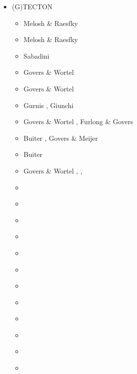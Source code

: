 \begin{itemize}
\item {\codefont (G)TECTON}  

\begin{scriptsize}
\begin{itemize}
\item[\nineteeneighty] Melosh \& Raesfky \cite{mera80}
\item[\nineteeneightyone] Melosh \& Raesfky \cite{mera81}
\item[\nineteeneightysix] Sabadini \etal \cite{sayp86}
\item[\nineteenninetythree] Govers \& Wortel \cite{gowo93}
\item[\nineteenninetyfive] Govers \& Wortel \cite{gowo95}
\item[\nineteenninetysix] Gurnis \etal \cite{guez96}, Giunchi \etal \cite{gisb96}
\item[\nineteenninetynine] Govers \& Wortel \cite{gowo99}, Furlong \& Govers \cite{fugo99}
\item[\twothousandone] Buiter \etal \cite{bugw01}, Govers \& Meijer \cite{gome01}
\item[\twothousandtwo] Buiter \etal \cite{bugw02}
\item[\twothousandfive] Govers \& Wortel \cite{gowo05}, \cite{vanw05},
                        \cite{vabl05}
\item[\twothousandsix] \cite{degw06}\cite{libi06}\cite{scdm06}
\item[\twothousandseven] \cite{vabl07}
\item[\twothousandeight] \cite{degw08}\cite{degw08b}
\item[\twothousandnine] \cite{ladg09}\cite{plmg09}
\item[\twothousandten] \cite{vago10}\cite{plmf10}
\item[\twothousandeleven] \cite{bagw11}\cite{bagw11b}
\item[\twothousandthirteen] \cite{plab13}\cite{wagw13}
\item[\twothousandfourteen] \cite{vagw14}
\item[\twothousandfifteen] \cite{mags15}\cite{nigo15}
\item[\twothousandsixteen] \cite{gemg16}\cite{masg16}
\item[\twothousandseventeen] \cite{ozgw17}
\item[\twothousandeighteen] \cite{gofv18}\cite{nigw18}\cite{hefg18}
\end{itemize}
\end{scriptsize}


\end{itemize}
